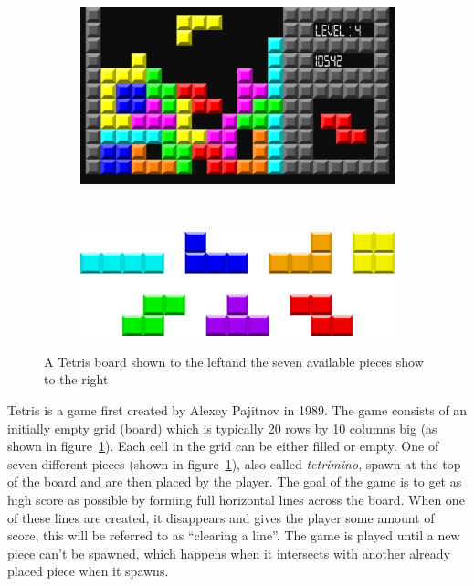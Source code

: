 \documentclass{article}
\begin{document}
\begin{figure}[hbt]
    \centering
    \begin{subfigure}{0.45\textwidth}
      \includegraphics[width=\textwidth]{15538236401_a2eb533997_b.jpg}
    \end{subfigure}~%
    \begin{subfigure}{0.45\textwidth}
      \includegraphics[width=\textwidth]{1280px-Tetrominoes_IJLO_STZ_Worlds.svg.png}
    \end{subfigure}
    \caption[asd]{A Tetris board shown to the left\footnotemark[1] and the seven available pieces show to the right\footnotemark[2]}
    \label{fig:tetris}
\end{figure}

Tetris is a game first created by Alexey Pajitnov in 1989. The game consists of an initially empty grid (board) which is typically 20 rows by 10 columns big (as shown in figure~\ref{fig:tetris}). Each cell in the grid can be either filled or empty. One of seven different pieces (shown in figure~\ref{fig:tetris}), also called \emph{tetrimino}, spawn at the top of the board and are then placed by the player. The goal of the game is to get as high score as possible by forming full horizontal lines across the board. When one of these lines are created, it disappears and gives the player some amount of score, this will be referred to as ``clearing a line''. The game is played until a new piece can't be spawned, which happens when it intersects with another already placed piece when it spawns.
\end{document}

